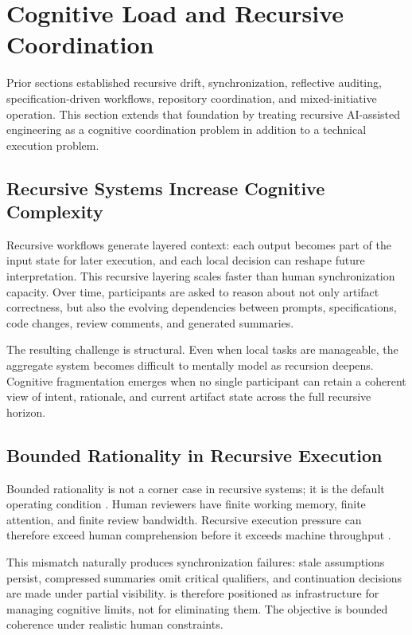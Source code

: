 \section{Cognitive Load and Recursive Coordination}
\label{sec:cognitive-load-recursive-coordination}

Prior sections established recursive drift, synchronization, reflective auditing, specification-driven workflows, repository coordination, and mixed-initiative operation. This section extends that foundation by treating recursive AI-assisted engineering as a cognitive coordination problem in addition to a technical execution problem.

\subsection{Recursive Systems Increase Cognitive Complexity}

Recursive workflows generate layered context: each output becomes part of the input state for later execution, and each local decision can reshape future interpretation. This recursive layering scales faster than human synchronization capacity. Over time, participants are asked to reason about not only artifact correctness, but also the evolving dependencies between prompts, specifications, code changes, review comments, and generated summaries.

The resulting challenge is structural. Even when local tasks are manageable, the aggregate system becomes difficult to mentally model as recursion deepens. Cognitive fragmentation emerges when no single participant can retain a coherent view of intent, rationale, and current artifact state across the full recursive horizon.

\subsection{Bounded Rationality in Recursive Execution}

Bounded rationality is not a corner case in recursive systems; it is the default operating condition \cite{Simon1957ModelsMan}. Human reviewers have finite working memory, finite attention, and finite review bandwidth. Recursive execution pressure can therefore exceed human comprehension before it exceeds machine throughput \cite{Sweller1988CognitiveLoad}.

This mismatch naturally produces synchronization failures: stale assumptions persist, compressed summaries omit critical qualifiers, and continuation decisions are made under partial visibility.  is therefore positioned as infrastructure for managing cognitive limits, not for eliminating them. The objective is bounded coherence under realistic human constraints.


